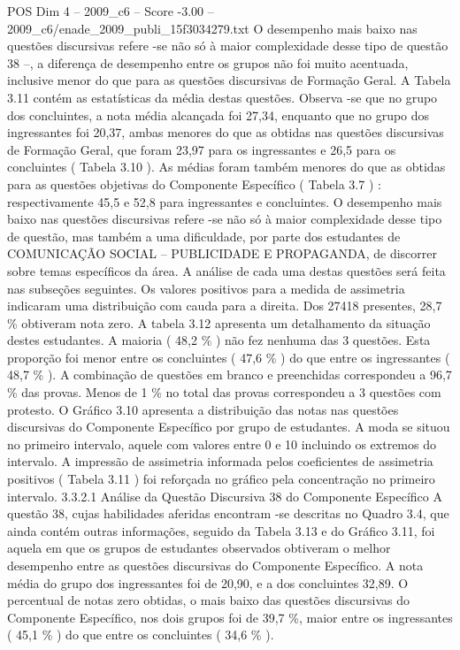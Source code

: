 \begin{textsample}{POS Dim 4 – 2009\_c6 – Score -3.00 – 2009\_c6/enade\_2009\_publi\_15f3034279.txt}
O desempenho mais baixo nas questões discursivas refere -se não só à maior complexidade desse tipo de questão 38 –, a diferença de desempenho entre os grupos não foi muito acentuada, inclusive menor do que para as questões discursivas de Formação Geral.
A Tabela 3.11 contém as estatísticas da média destas questões.
Observa -se que no grupo dos concluintes, a nota média alcançada foi 27,34, enquanto que no grupo dos ingressantes foi 20,37, ambas menores do que as obtidas nas questões discursivas de Formação Geral, que foram 23,97 para os ingressantes e 26,5 para os concluintes ( Tabela 3.10 ).
As médias foram também menores do que as obtidas para as questões objetivas do Componente Específico ( Tabela 3.7 ) : respectivamente 45,5 e 52,8 para ingressantes e concluintes.
O desempenho mais baixo nas questões discursivas refere -se não só à maior complexidade desse tipo de questão, mas também a uma dificuldade, por parte dos estudantes de COMUNICAÇÃO SOCIAL – PUBLICIDADE E PROPAGANDA, de discorrer sobre temas específicos da área.
A análise de cada uma destas questões será feita nas subseções seguintes.
Os valores positivos para a medida de assimetria indicaram uma distribuição com cauda para a direita.
Dos 27418 presentes, 28,7 \% obtiveram nota zero.
A tabela 3.12 apresenta um detalhamento da situação destes estudantes.
A maioria ( 48,2 \% ) não fez nenhuma das 3 questões.
Esta proporção foi menor entre os concluintes ( 47,6 \% ) do que entre os ingressantes ( 48,7 \% ).
A combinação de questões em branco e preenchidas correspondeu a 96,7 \% das provas.
Menos de 1 \% no total das provas correspondeu a 3 questões com protesto.
O Gráfico 3.10 apresenta a distribuição das notas nas questões discursivas do Componente Específico por grupo de estudantes.
A moda se situou no primeiro intervalo, aquele com valores entre 0 e 10 incluindo os extremos do intervalo.
A impressão de assimetria informada pelos coeficientes de assimetria positivos ( Tabela 3.11 ) foi reforçada no gráfico pela concentração no primeiro intervalo. 3.3.2.1 Análise da Questão Discursiva 38 do Componente Específico A questão 38, cujas habilidades aferidas encontram -se descritas no Quadro 3.4, que ainda contém outras informações, seguido da Tabela 3.13 e do Gráfico 3.11, foi aquela em que os grupos de estudantes observados obtiveram o melhor desempenho entre as questões discursivas do Componente Específico.
A nota média do grupo dos ingressantes foi de 20,90, e a dos concluintes 32,89.
O percentual de notas zero obtidas, o mais baixo das questões discursivas do Componente Específico, nos dois grupos foi de 39,7 \%, maior entre os ingressantes ( 45,1 \% ) do que entre os concluintes ( 34,6 \% ).

\end{textsample}
